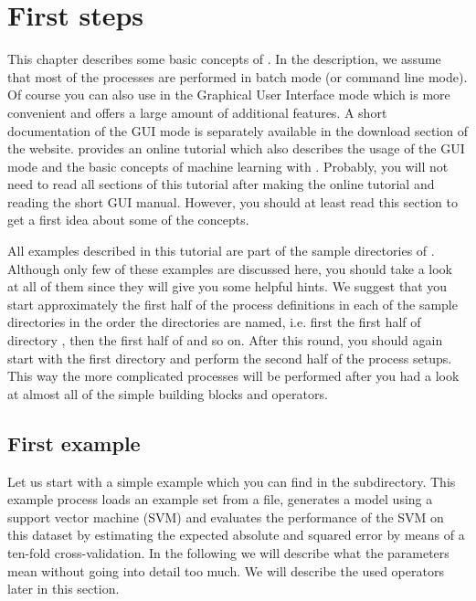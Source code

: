 \chapter{First steps}
\label{sec:first_steps}

This chapter describes some basic concepts of \rapidminer. In the description, we assume that 
most of the processes are performed in batch mode (or command line mode). Of course you can also use \rapidminer in the
Graphical User Interface mode which is more convenient and offers a large
amount of additional features. A short documentation of the GUI mode
is separately available in the download section of the \rapidminer website.
\rapidminer provides an online tutorial which also describes the usage of the
GUI mode and the basic concepts of machine learning with \rapidminer.
Probably, you will not need to read all sections of this tutorial after making the
online tutorial and reading the short GUI manual. However, you should at least
read this section to get a first idea about some of the \rapidminer concepts.

All examples described in this tutorial are part of the sample directories of
\rapidminer. Although only few of these examples are discussed here, you should take
a look at all of them since they will give you some helpful hints. We
suggest that you start approximately the first half of the process definitions in each
of the sample directories in the order the directories are named, i.e. first
the first half of directory , then the first half of  and so
on. After this round, you should again start with the first directory and
perform the second half of the process setups. This way the more complicated
processes will be performed after you had a look at almost all of the simple
building blocks and operators.

\section{First example}
\label{sec:firstexample}


Let us start with a simple example  which
you can find in the  subdirectory. This example process loads an example set
from a file, generates a model using a support vector machine (SVM)
and evaluates the performance of the SVM on this dataset by estimating
the expected absolute and squared error by means of a ten-fold
cross-validation. In the following we will describe what the
parameters mean without going into detail too much. We will describe
the used operators later in this section.

